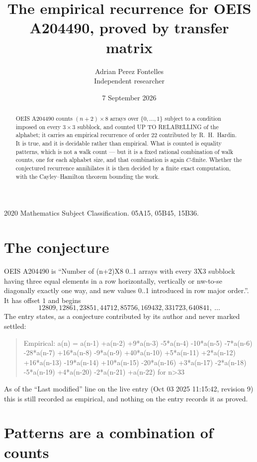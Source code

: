 \documentclass[11pt,a4paper]{article}
\title{The empirical recurrence for OEIS A204490, proved by transfer matrix}
\author{Adrian Perez Fontelles\\ \small Independent researcher}
\date{7 September 2026}
\theoremstyle{plain}
\theoremstyle{definition}
\begin{document}
\maketitle

\begin{abstract}
OEIS A204490 counts $(n+2)\times8$ arrays over $\{0,\dots,1\}$ subject to a condition imposed on
every $3\times3$ subblock, and counted UP TO RELABELLING of the
alphabet; it carries an empirical recurrence of order $22$ contributed by
R.~H.~Hardin. It is true, and it is decidable rather than empirical. What is counted is
equality patterns, which is not a walk count --- but it is a fixed rational combination of
walk counts, one for each alphabet size, and that combination is again $C$-finite. Whether the
conjectured recurrence annihilates it is then decided by a finite exact computation, with the
Cayley--Hamilton theorem bounding the work.
\end{abstract}

\noindent\small 2020 Mathematics Subject Classification. 05A15, 05B45, 15B36.\normalsize

\section{The conjecture}

OEIS A204490 is ``Number of (n+2)X8 0..1 arrays with every 3X3 subblock having three equal elements in a row horizontally, vertically or nw-to-se diagonally exactly one way, and new values 0..1 introduced in row major order.''. It has offset $1$ and begins
\[
12809, 12861, 23851, 44712, 85756, 169432, 331723, 640841,\ \dots
\]
The entry states, as a conjecture contributed by its author and never marked settled:
\begin{quote}
Empirical: a(n) = a(n-1) +a(n-2) +9*a(n-3) -5*a(n-4) -10*a(n-5) -7*a(n-6) -28*a(n-7) +16*a(n-8) -9*a(n-9) +40*a(n-10) +5*a(n-11) +2*a(n-12) +16*a(n-13) -19*a(n-14) +10*a(n-15) -20*a(n-16) +3*a(n-17) -2*a(n-18) -5*a(n-19) +4*a(n-20) -2*a(n-21) +a(n-22) for n>33
\end{quote}
As of the ``Last modified'' line on the live entry (Oct 03 2025 11:15:42, revision 9) this is still
recorded as empirical, and nothing on the entry records it as proved.

\section{Patterns are a combination of counts}
\end{document}
